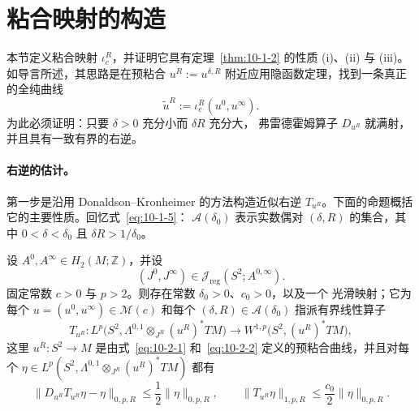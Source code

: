 
\section{粘合映射的构造}\label{sec:10-5}

本节定义粘合映射 $\iota_c^R$，并证明它具有定理~\ref{thm:10-1-2} 的性质
(i)、(ii) 与 (iii)。如导言所述，其思路是在预粘合
$u^R:=u^{\delta,R}$ 附近应用隐函数定理，找到一条真正的全纯曲线
\[
  \widetilde u^R:=\iota_c^R(u^0,u^\infty).
\]
为此必须证明：只要 $\delta>0$ 充分小而 $\delta R$ 充分大，
弗雷德霍姆算子 $D_{u^R}$ 就满射，并且具有一致有界的右逆。

\paragraph{右逆的估计。}
第一步是沿用 Donaldson--Kronheimer  的方法构造近似右逆
$T_{u^R}$。下面的命题概括它的主要性质。回忆式~\eqref{eq:10-1-5}：
$\mathcal A(\delta_0)$ 表示实数偶对 $(\delta,R)$ 的集合，其中
$0<\delta<\delta_0$ 且 $\delta R>1/\delta_0$。

\begin{proposition}\label{prop:10-5-1}
设 $A^0,A^\infty\in H_2(M;\mathbb Z)$，并设
\[
  (J^0,J^\infty)\in
  \mathcal J_{\mathrm{reg}}(S^2;A^{0,\infty}).
\]
固定常数 $c>0$ 与 $p>2$。则存在常数 $\delta_0>0$、$c_0>0$，以及一个
光滑映射；它为每个 $u=(u^0,u^\infty)\in\mathcal M(c)$ 和每个
$(\delta,R)\in\mathcal A(\delta_0)$ 指派有界线性算子
\[
  T_{u^R}:
  L^p\bigl(S^2,\Lambda^{0,1}\otimes_{J^R}(u^R)^*TM\bigr)
  \longrightarrow
  W^{1,p}\bigl(S^2,(u^R)^*TM\bigr),
\]
这里 $u^R:S^2\to M$ 是由式~\eqref{eq:10-2-1} 和~\eqref{eq:10-2-2}
定义的预粘合曲线，并且对每个
$\eta\in L^p(S^2,\Lambda^{0,1}\otimes_{J^R}(u^R)^*TM)$ 都有
\begin{equation}\label{eq:10-5-1}
  \bigl\|D_{u^R}T_{u^R}\eta-\eta\bigr\|_{0,p,R}
  \le\frac12\|\eta\|_{0,p,R},
  \qquad
  \bigl\|T_{u^R}\eta\bigr\|_{1,p,R}
  \le\frac{c_0}{2}\|\eta\|_{0,p,R}.
\end{equation}
\end{proposition}

